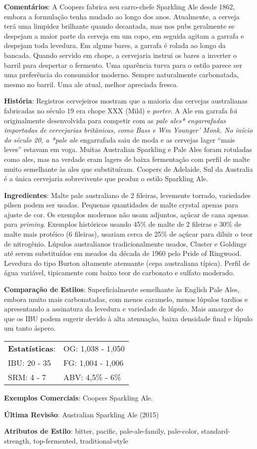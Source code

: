 \textbf{Comentários}: A Coopers fabrica seu carro-chefe Sparkling Ale desde 1862, embora a formulação tenha mudado ao longo dos anos. Atualmente, a cerveja terá uma limpidez brilhante quando decantada, mas nos pubs geralmente se despejam a maior parte da cerveja em um copo, em seguida agitam a garrafa e despejam toda levedura. Em alguns bares, a garrafa é rolada ao longo da bancada. Quando servido em chope, a cervejaria instrui os bares a inverter o barril para despertar o fermento. Uma aparência turva para o estilo parece ser uma preferência do consumidor moderno. Sempre naturalmente carbonatada, mesmo no barril. Uma ale atual, melhor apreciada fresca.

\textbf{História}: Registros cervejeiros mostram que a maioria das cervejas australianas fabricadas no século 19 era chope XXX (Mild) e \textit{porter}. A Ale em garrafa foi originalmente desenvolvida para competir com as \textit{pale ales* engarrafadas importadas de cervejarias britânicas, como Bass e Wm Younger' Monk. No início do século 20, a *pale ale} engarrafada saiu de moda e as cervejas lager “mais leves” estavam em voga. Muitas Australian Sparkling e Pale Ales foram rotuladas como ales, mas na verdade eram lagers de baixa fermentação com perfil de malte muito semelhante às ales que substituíram. Coopers de Adelaide, Sul da Australia é a única cervejaria sobrevivente que produz o estilo Sparkling Ale.

\textbf{Ingredientes}: Malte pale australiano de 2 fileiras, levemente torrado, variedades pilsen podem ser usadas. Pequenas quantidades de malte crystal apenas para ajuste de cor. Os exemplos modernos não usam adjuntos, açúcar de cana apenas para \textit{priming}. Exemplos históricos usando 45\% de malte de 2 fileiras e 30\% de malte mais protéico (6 fileiras), usariam cerca de 25\% de açúcar para diluir o teor de nitrogênio. Lúpulos australianos tradicionalmente usados, Cluster e Goldings até serem substituídos em meados da década de 1960 pelo Pride of Ringwood. Levedura do tipo Burton altamente atenuante (cepa australiana típica). Perfil de água variável, tipicamente com baixo teor de carbonato e sulfato moderado.

\textbf{Comparação de Estilos}: Superficialmente semelhante às English Pale Ales, embora muito mais carbonatadas, com menos caramelo, menos lúpulos tardios e apresentando a assinatura da levedura e variedade de lúpulo. Mais amargor do que os IBU podem sugerir devido à alta atenuação, baixa densidade final e lúpulo um tanto áspero.

\begin{tabular}{@{}p{35mm}p{35mm}@{}}
  \textbf{Estatísticas}: & OG: 1,038 - 1,050 \\
  IBU: 20 - 35  & FG: 1,004 - 1,006 \\
  SRM: 4 - 7  & ABV: 4,5\% - 6\%
\end{tabular}

\textbf{Exemplos Comerciais}: Coopers Sparkling Ale.

\textbf{Última Revisão}: Australian Sparkling Ale (2015)

\textbf{Atributos de Estilo}: bitter, pacific, pale-ale-family, pale-color, standard-strength, top-fermented, traditional-style
